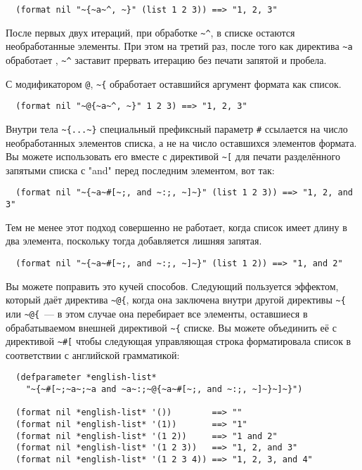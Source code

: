 \begin{verbatim}
  (format nil "~{~a~^, ~}" (list 1 2 3)) ==> "1, 2, 3"
\end{verbatim}

После первых двух итераций, при обработке \lstinline!~^!, в списке остаются необработанные
элементы. При этом на третий раз, после того как директива \lstinline!~a! обработает
, \lstinline!~^! заставит  прервать итерацию без печати запятой и
пробела.

С модификатором \lstinline!@!, \lstinline!~{! обработает оставшийся аргумент формата как список.

\begin{verbatim}
  (format nil "~@{~a~^, ~}" 1 2 3) ==> "1, 2, 3"
\end{verbatim}

Внутри тела \lstinline!~{...~}! специальный префиксный параметр \lstinline!#! ссылается на число необработанных элементов списка, а
не на число оставшихся элементов формата. Вы можете использовать его вместе с директивой \lstinline!~[! для печати
разделённого запятыми списка с "and" перед последним элементом, вот так:

\begin{verbatim}
  (format nil "~{~a~#[~;, and ~:;, ~]~}" (list 1 2 3)) ==> "1, 2, and 3"
\end{verbatim}

Тем не менее этот подход совершенно не работает, когда список имеет длину в два элемента,
поскольку тогда добавляется лишняя запятая.

\begin{verbatim}
  (format nil "~{~a~#[~;, and ~:;, ~]~}" (list 1 2)) ==> "1, and 2"
\end{verbatim}

Вы можете поправить это кучей способов. Следующий пользуется эффектом, который даёт директива \lstinline!~@{!, когда она
заключена внутри другой директивы \lstinline!~{! или \lstinline!~@{!~--- в этом случае она перебирает все элементы, оставшиеся в
обрабатываемом внешней директивой \lstinline!~{! списке. Вы можете объединить её с директивой \lstinline!~#[! чтобы следующая
управляющая строка форматировала список в соответствии с английской грамматикой:

\begin{verbatim}
  (defparameter *english-list*
    "~{~#[~;~a~;~a and ~a~:;~@{~a~#[~;, and ~:;, ~]~}~]~}")

  (format nil *english-list* '())        ==> ""
  (format nil *english-list* '(1))       ==> "1"
  (format nil *english-list* '(1 2))     ==> "1 and 2"
  (format nil *english-list* '(1 2 3))   ==> "1, 2, and 3"
  (format nil *english-list* '(1 2 3 4)) ==> "1, 2, 3, and 4"
\end{verbatim}

